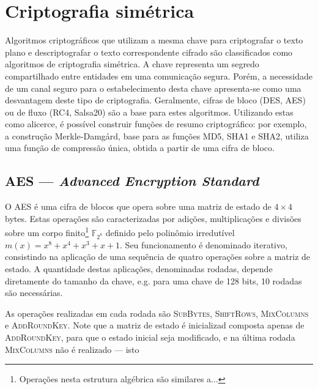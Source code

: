 \documentclass{article}
\begin{document}
\section{Criptografia simétrica}

Algoritmos criptográficos que utilizam a mesma chave para criptografar o
texto plano e descriptografar o texto correspondente cifrado são classificados
como algoritmos de criptografia simétrica. A chave representa um segredo
compartilhado entre entidades em uma comunicação segura. Porém, a necessidade
de um canal seguro para o estabelecimento desta chave apresenta-se como uma
desvantagem deste tipo de criptografia. Geralmente, cifras de bloco (DES, AES)
ou de fluxo (RC4, Salsa20) são a base para estes algoritmos. Utilizando estas
como alicerce, é possível construir funções de resumo criptográfico: por
exemplo, a construção Merkle-Damgård, base para as funções MD5, SHA1 e SHA2,
utiliza uma função de compressão única, obtida a partir de uma cifra de bloco.

\subsection{AES --- \emph{Advanced Encryption Standard}}

O AES é uma cifra de blocos que opera sobre uma matriz de estado de $4 \times 4$ bytes. Estas operações são caracterizadas por adições, multiplicações e divisões sobre um corpo finito\footnote{Operações nesta estrutura algébrica são similares a...}
$\mathbb{F}_{2^{8}}$ definido pelo polinômio irredutível $m(x) = x^{8} + x^{4} + x^{3} + x + 1$. Seu funcionamento é denominado
iterativo, consistindo na aplicação de uma sequência de quatro operações sobre a matriz de estado. A quantidade destas aplicações, denominadas rodadas, depende diretamente do tamanho da chave, e.g. para uma chave de 128 bits, 10 rodadas são necessárias.

As operações realizadas em cada rodada são \textsc{SubBytes}, \textsc{ShiftRows}, \textsc{MixColumns} e \textsc{AddRoundKey}. Note que a matriz de estado é inicializad
composta apenas de \textsc{AddRoundKey}, para que o estado inicial seja modificado, e na última rodada \textsc{MixColumns} não é realizado --- isto 
\end{document}
